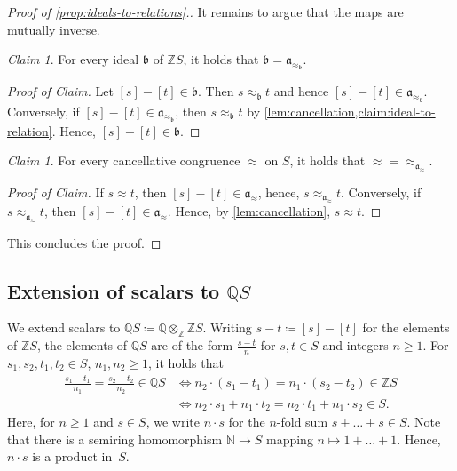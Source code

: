 \documentclass[11pt]{scrartcl}
\theoremstyle{definition}
\theoremstyle{plain}
\theoremstyle{remark}
\newtheorem{claim}[definition]{Claim}
\newenvironment{claimproof}[1][Proof of Claim]{\begin{proof}[#1] \renewcommand{\qedsymbol}{$\lrcorner$}}{ \end{proof}}
\begin{document}
\begin{proof}[Proof of \cref{prop:ideals-to-relations}.]
		It remains to argue that the maps are mutually inverse.

		\begin{claim}
			For every ideal $\mathfrak{b}$ of $\mathbb{Z}S$,
			it holds that
			$\mathfrak{b} = \mathfrak{a}_{\approx_{\mathfrak{b}}}$.
		\end{claim}
		\begin{claimproof}
			Let $[s] - [t] \in \mathfrak{b}$.
			Then $s \approx_{\mathfrak{b}} t$
			and hence $[s] - [t] \in \mathfrak{a}_{\approx_{\mathfrak{b}}}$.
			Conversely, 
			if $[s] - [t] \in \mathfrak{a}_{\approx_{\mathfrak{b}}}$,
			then $s \approx_{\mathfrak{b}} t$ by \cref{lem:cancellation,claim:ideal-to-relation}.
			Hence, $[s] - [t] \in \mathfrak{b}$.
		\end{claimproof}

		\begin{claim}
			For every cancellative congruence $\approx$ on $S$,
			it holds that
			${\approx} = {\approx_{\mathfrak{a}_{\approx}}}$.
		\end{claim}
		\begin{claimproof}
			If $s \approx t$,
			then $[s] - [t] \in \mathfrak{a}_{\approx}$,
			hence, $s \approx_{\mathfrak{a}_{\approx}} t$.
			Conversely,
			if $s \approx_{\mathfrak{a}_{\approx}} t$,
			then $[s] - [t] \in \mathfrak{a}_{\approx}$.
			Hence, by \cref{lem:cancellation},
			$s \approx t$.
		\end{claimproof}

		This concludes the proof.
	\end{proof}

	\subsection{Extension of scalars to \texorpdfstring{$\mathbb{Q}S$}{QS}}
	\label{sec:extension-of-scalars-Q}

	We extend scalars to $\mathbb{Q}S \coloneqq \mathbb{Q} \otimes_{\mathbb{Z}} \mathbb{Z}S$.
	Writing $s - t \coloneqq [s] - [t]$ for the elements of $\mathbb{Z}S$, 
	the elements of $\mathbb{Q}S$ are of the form $\frac{s-t}{n}$ for $s,t \in S$ and integers $n \geq 1$.
	For $s_1, s_2, t_1, t_2 \in S$, $n_1, n_2 \geq 1$, 
	it holds that
	\begin{align*}
		\frac{s_1 - t_1}{n_1}
		= \frac{s_2 - t_2}{n_2}
		\in \mathbb{Q}S
		&\iff n_2\cdot (s_1 - t_1) = n_1\cdot(s_2 - t_2) \in \mathbb{Z}S\\
		&\iff n_2\cdot s_1 + n_1 \cdot t_2 = n_2\cdot t_1 + n_1\cdot s_2 \in S.
	\end{align*}
	Here, for $n \geq 1$ and $s \in S$, 
	we write $n\cdot s$ for the $n$-fold sum $s + \dots + s \in S$.
	Note that there is a semiring homomorphism $\mathbb{N} \to S$ mapping $n \mapsto 1 + \dots + 1$.
	Hence, $n \cdot s$ is a product in~$S$.
\end{document}
